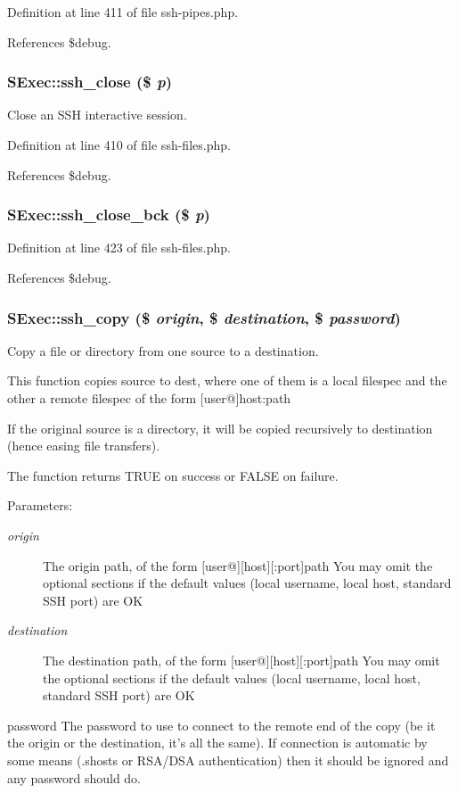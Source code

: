 Definition at line 411 of file ssh-pipes.php.

References \$debug.
\subsubsection{\setlength{\rightskip}{0pt plus 5cm}SExec::ssh\_\-close (\$ {\em p})}\label{classSExec_a7}


Close an SSH interactive session. 



Definition at line 410 of file ssh-files.php.

References \$debug.
\subsubsection{\setlength{\rightskip}{0pt plus 5cm}SExec::ssh\_\-close\_\-bck (\$ {\em p})}\label{classSExec_a8}




Definition at line 423 of file ssh-files.php.

References \$debug.
\subsubsection{\setlength{\rightskip}{0pt plus 5cm}SExec::ssh\_\-copy (\$ {\em origin}, \$ {\em destination}, \$ {\em password})}\label{classSExec_a15}


Copy a file or directory from one source to a destination. 

This function copies source to dest, where one of them is a local filespec and the other a remote filespec of the form [user@]host:path

If the original source is a directory, it will be copied recursively to destination (hence easing file transfers).

The function returns TRUE on success or FALSE on failure.

\begin{Desc}
\item[Parameters:]
\begin{description}
\item[{\em origin}]The origin path, of the form [user@][host][:port]path You may omit the optional sections if the default values (local username, local host, standard SSH port) are OK\item[{\em destination}]The destination path, of the form [user@][host][:port]path You may omit the optional sections if the default values (local username, local host, standard SSH port) are OK\end{description}
\end{Desc}
password The password to use to connect to the remote end of the copy (be it the origin or the destination, it's all the same). If connection is automatic by some means (.shosts or RSA/DSA authentication) then it should be ignored and any password should do.

